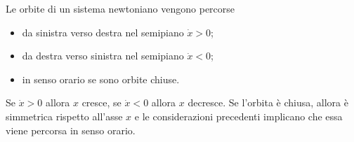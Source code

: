 \begin{Theorem}
	Le orbite di un sistema newtoniano vengono percorse
	\begin{itemize}
		\item da sinistra verso destra nel semipiano $\dot{x} > 0$; 
		\item da destra verso sinistra nel semipiano $\dot{x} < 0$;
		\item in senso orario se sono orbite chiuse.
	\end{itemize}
\end{Theorem}
\Proof Se $\dot{x} > 0$ allora $x$ cresce, se $\dot{x} < 0$ allora $x$ decresce. Se l'orbita \`e chiusa, allora \`e simmetrica rispetto all'asse $x$ e le considerazioni precedenti implicano che essa viene percorsa in senso orario. \EndProof
